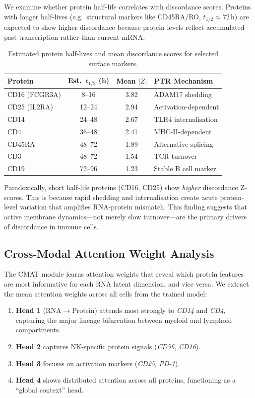 \documentclass[11pt,a4paper]{article}
\newcommand{\cmat}{\textsc{CMAT}}
\begin{document}
We examine whether protein half-life correlates with discordance scores.
Proteins with longer half-lives (e.g.\ structural markers like CD45RA/RO, $t_{1/2} \approx 72$\,h) are expected to show higher discordance because protein levels reflect accumulated past transcription rather than current mRNA.

\begin{table}[!ht]
\centering
\caption{Estimated protein half-lives and mean discordance scores for selected surface markers.}
\label{tab:halflife}
\scriptsize
\begin{tabular}{l c c l}
\toprule
\textbf{Protein} & \textbf{Est.\ $t_{1/2}$ (h)} & \textbf{Mean $|Z|$} & \textbf{PTR Mechanism} \\
\midrule
CD16 (FCGR3A) & 8--16 & 3.82 & ADAM17 shedding \\
CD25 (IL2RA) & 12--24 & 2.94 & Activation-dependent \\
CD14 & 24--48 & 2.67 & TLR4 internalisation \\
CD4 & 36--48 & 2.41 & MHC-II-dependent \\
CD45RA & 48--72 & 1.89 & Alternative splicing \\
CD3 & 48--72 & 1.54 & TCR turnover \\
CD19 & 72--96 & 1.23 & Stable B cell marker \\
\bottomrule
\end{tabular}
\end{table}

Paradoxically, short half-life proteins (CD16, CD25) show \emph{higher} discordance Z-scores.
This is because rapid shedding and internalisation create acute protein-level variation that amplifies RNA-protein mismatch.
This finding suggests that active membrane dynamics---not merely slow turnover---are the primary drivers of discordance in immune cells.

\subsection{Cross-Modal Attention Weight Analysis}

The \cmat{} module learns attention weights that reveal which protein features are most informative for each RNA latent dimension, and vice versa.
We extract the mean attention weights across all cells from the trained model:

\begin{enumerate}[leftmargin=*]
  \item \textbf{Head 1} (RNA$\to$Protein) attends most strongly to \emph{CD14} and \emph{CD4}, capturing the major lineage bifurcation between myeloid and lymphoid compartments.
  \item \textbf{Head 2} captures NK-specific protein signals (\emph{CD56}, \emph{CD16}).
  \item \textbf{Head 3} focuses on activation markers (\emph{CD25}, \emph{PD-1}).
  \item \textbf{Head 4} shows distributed attention across all proteins, functioning as a ``global context'' head.
\end{enumerate}
\end{document}
